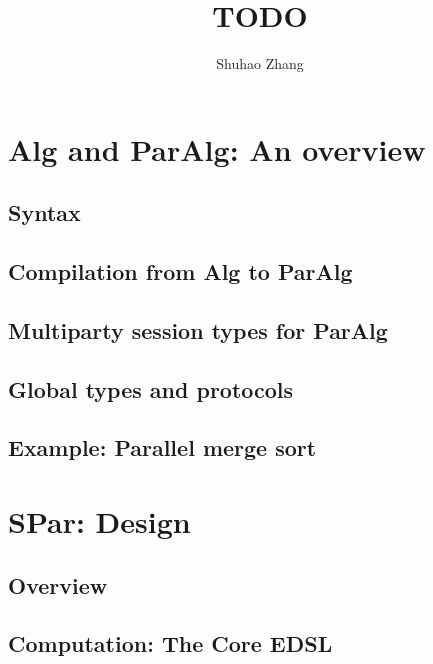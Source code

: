 \documentclass[a4paper, twoside]{report}
\title{TODO}
\author{Shuhao Zhang}
\begin{document}




\tableofcontents



% 
% 
\chapter{Alg and ParAlg: An overview}
\section{Syntax}
\section{Compilation from Alg to ParAlg}
\section{Multiparty session types for ParAlg}
\section{Global types and protocols}
\section{Example: Parallel merge sort}

\chapter{SPar: Design}
\section{Overview}
\section{Computation: The Core EDSL}
\end{document}
